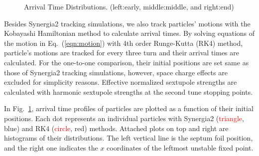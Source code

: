 \documentclass[aps,prstab,onecolumn,preprint,endfloats,11pt]{revtex4-1}
\begin{document}
\begin{figure}[!tbp]
  \caption{\label{fig:arrival2}Arrival Time Distributions. (left:early, middle:middle, and right:end)}
\end{figure}

Besides Synergia2 tracking simulations, we also track particles' motions with the Kobayashi Hamiltonian method to calculate arrival times. By solving equations of the motion in Eq.~(\ref{eqn:motion}) with 4th order Runge-Kutta (RK4) method, particle's motions are tracked for every three turn and their arrival times are calculated. For the one-to-one comparison, their initial positions are set same as those of Synergia2 tracking simulations, however, space charge effects are excluded for simplicity reasons. Effective normalized sextupole strengths are calculated with harmonic sextupole strengths at the second tune stopping points.

In Fig.~\ref{fig:arrival2}, arrival time profiles of particles are plotted as a function of their initial positions. Each dot represents an individual particles with Synergia2 (\textcolor{red}{triangle}, blue) and RK4 (\textcolor{red}{circle}, red) methods. Attached plots on top and right are histograms of their distributions. The left vertical line is the septum foil position, and the right one indicates the $x$ coordinates of the leftmost unstable fixed point. 
\end{document}
